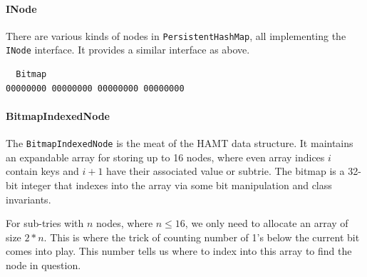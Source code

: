 \documentclass[preprint]{sigplanconf}
\begin{document}
\paragraph{INode}

There are various kinds of nodes in \texttt{PersistentHashMap},
all implementing the \texttt{INode} interface.
It provides a similar interface as above.

\begin{verbatim}
  Bitmap
00000000 00000000 00000000 00000000
\end{verbatim}

\paragraph{BitmapIndexedNode}

The \texttt{BitmapIndexedNode}
is the meat of the HAMT data structure.
It maintains an expandable array for storing up to 
16 nodes, where even array indices $i$ contain
keys and $i+1$ have their associated value or
subtrie.
The bitmap is a 32-bit integer that indexes
into the array via some bit manipulation
and class invariants.


For sub-tries with $n$ nodes, where $n \le 16$, we only need to allocate
an array of size $2*n$.
This is where the trick of counting number of 1's below the current
bit comes into play.
This number tells us where to index into this array to find the node
in question.

\end{document}
